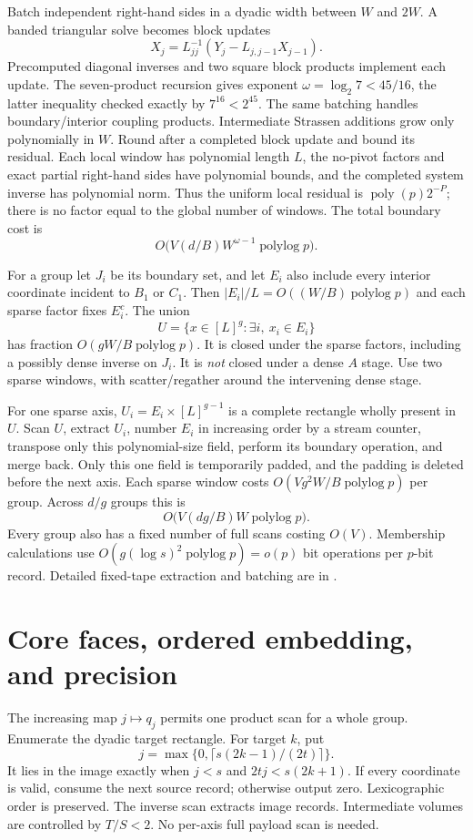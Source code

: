 \documentclass[11pt]{article}
\newcommand{\poly}{\operatorname{poly}}
\newcommand{\plog}{\operatorname{polylog}}
\newcommand{\file}[1]{\href{#1}{\texttt{\detokenize{#1}}}}
\begin{document}
Batch independent right-hand sides in a dyadic width between $W$ and $2W$. A banded triangular solve becomes block updates
\[
 X_j=L_{jj}^{-1}(Y_j-L_{j,j-1}X_{j-1}).
\]
Precomputed diagonal inverses and two square block products implement each update. The seven-product recursion gives exponent $\omega=\log_2 7<45/16$, the latter inequality checked exactly by $7^{16}<2^{45}$. The same batching handles boundary/interior coupling products. Intermediate Strassen additions grow only polynomially in $W$. Round after a completed block update and bound its residual. Each local window has polynomial length $L$, the no-pivot factors and exact partial right-hand sides have polynomial bounds, and the completed system inverse has polynomial norm. Thus the uniform local residual is $\poly(p)2^{-P}$; there is no factor equal to the global number of windows. The total boundary cost is
\[
 O\bigl(V(d/B)W^{\omega-1}\plog p\bigr).
\]

For a group let $J_i$ be its boundary set, and let $E_i$ also include every interior coordinate incident to $B_1$ or $C_1$. Then $|E_i|/L=O((W/B)\plog p)$ and each sparse factor fixes $E_i^c$. The union
\[
 U=\{x\in[L]^g:\exists i,\ x_i\in E_i\}
\]
has fraction $O(gW/B\plog p)$. It is closed under the sparse factors, including a possibly dense inverse on $J_i$. It is \emph{not} closed under a dense $A$ stage. Use two sparse windows, with scatter/regather around the intervening dense stage.

For one sparse axis, $U_i=E_i\times[L]^{g-1}$ is a complete rectangle wholly present in $U$. Scan $U$, extract $U_i$, number $E_i$ in increasing order by a stream counter, transpose only this polynomial-size field, perform its boundary operation, and merge back. Only this one field is temporarily padded, and the padding is deleted before the next axis. Each sparse window costs $O(Vg^2W/B\plog p)$ per group. Across $d/g$ groups this is
\[
 O\bigl(V(dg/B)W\plog p\bigr).
\]
Every group also has a fixed number of full scans costing $O(V)$. Membership calculations use $O(g(\log s)^2\plog p)=o(p)$ bit operations per $p$-bit record. Detailed fixed-tape extraction and batching are in \file{PHASE-LAYOUT-AUDIT.md}.

\section{Core faces, ordered embedding, and precision}

The increasing map $j\mapsto q_j$ permits one product scan for a whole group. Enumerate the dyadic target rectangle. For target $k$, put
\[
 j=\max\{0,\lceil s(2k-1)/(2t)\rceil\}.
\]
It lies in the image exactly when $j<s$ and $2tj<s(2k+1)$. If every coordinate is valid, consume the next source record; otherwise output zero. Lexicographic order is preserved. The inverse scan extracts image records. Intermediate volumes are controlled by $T/S<2$. No per-axis full payload scan is needed.
\end{document}
